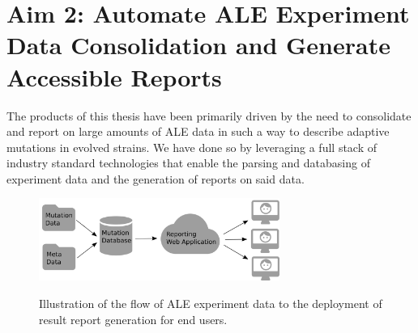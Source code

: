 \documentclass[12pt,final,masters,chapterheads]{ucsd}  %
\begin{document}
%
%
%
%

\chapter{Aim 2: Automate ALE Experiment Data Consolidation and Generate Accessible Reports}

%
%



The products of this thesis have been primarily driven by the need to consolidate and report on large amounts of ALE data in such a way to describe adaptive mutations in evolved strains. We have done so by leveraging a full stack of industry standard technologies that enable the parsing and databasing of experiment data and the generation of reports on said data.
\begin{figure}[H]
  \caption{Illustration of the flow of ALE experiment data to the deployment of result report generation for end users.}
  \centering
  \includegraphics[width=0.7\textwidth]{deployment_diagram.png}
  \label{fig:deployment_diagram}
\end{figure}
\end{document}
